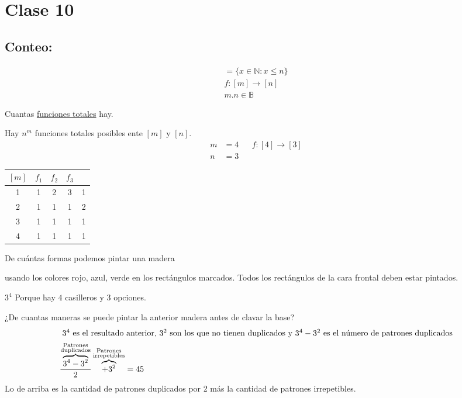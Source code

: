 \documentclass[../main.tex]{subfiles}
\begin{document}
\chapter*{Clase 10}%

\thispagestyle{fancy}

\section{Conteo:}%
\label{sec:Conteo:}

\begin{align*}
	[n] = \{x\in\mathbb{N}:x\leq n\}\\
	f:[m]\longrightarrow[n]\\
	m.n\in\mathbb{B}
\end{align*}

Cuantas \underline{funciones totales} hay.



Hay $n^m$ funciones totales posibles ente $[m]$ y $[n]$.
\begin{align*}
	m &=4 && f:[4]\longrightarrow[3]\\
	n &=3
\end{align*}

\begin{center}
	\begin{tabular}{c|c|c|c|c}
		$[m]$ & $f_1$ & $f_2$ & $f_3$ & \\
		\hline
		1 & 1 & 2 & 3 & 1\\
		2 & 1 & 1 & 1 & 2\\
		3 & 1 & 1 & 1 & 1\\
		4 & 1 & 1 & 1 & 1\\
	\end{tabular}
\end{center}

De cuántas formas podemos pintar una madera
usando los colores rojo, azul, verde en los rectángulos marcados.
Todos los rectángulos de la cara frontal deben estar pintados.

$3^4$
Porque hay $4$ casilleros y $3$ opciones.

¿De cuantas maneras se puede pintar la anterior madera antes de clavar la base?
\begin{align*}
	\intertext{ $3^4$ es el resultado anterior, $3^2$ son los que no
	tienen duplicados y $3^4-3^2$ es el número de patrones duplicados}
	\frac{\overbrace{3^4-3^2 }^{\substack{\text{Patrones}\\\text{duplicados}} }}{2}
	\overbrace{+3^2}^{\substack{\text{Patrones}\\\text{irrepetibles}} } = 45
\end{align*}
Lo de arriba es la cantidad de patrones duplicados por 2 más la cantidad de patrones
irrepetibles.
\end{document}
